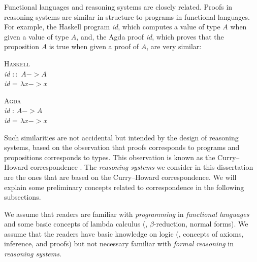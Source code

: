 Functional languages and reasoning systems are closely related.
Proofs in reasoning systems are similar in structure to programs
in functional languages. For example, the Haskell program \textit{id},
which computes a value of type $A$ when given a value of type $A$,
and, the Agda proof \textit{id}, which proves that the proposition $A$
is true when given a proof of $A$, are very similar:
\begin{center}
\begin{singlespace}
\begin{minipage}{.4\linewidth}
	\textsc{Haskell} \vspace*{.5em} \\
\textit{id} $::$ $A -> A$ \\
\textit{id} = $\lambda x -> x$
\end{minipage}
\begin{minipage}{.4\linewidth}
	\textsc{Agda}  \vspace*{.5em} \\
\textit{id} : $A -> A$ \\
\textit{id} = $\lambda x -> x$
\end{minipage}
\end{singlespace}
\end{center}\vspace*{.5em}
Such similarities are not accidental but intended by the design of
reasoning systems, based on the observation that proofs corresponds
to programs and propositions corresponds to types. This observation
is known as the Curry--Howard correspondence \cite{Howard69}.
The \emph{reasoning systems} we consider in this dissertation
are the ones that are based on the Curry--Howard correspondence.
We will explain some preliminary concepts related to correspondence
in the following subsections.

We assume that readers are familiar with \emph{programming}
in \emph{functional languages} and some basic concepts of lambda calculus
(\eg, $\beta$-reduction, normal forms). We assume that the readers have
basic knowledge on logic (\eg, concepts of axioms, inference, and proofs)
but not necessary familiar with \emph{formal reasoning}
in \emph{reasoning systems}.

